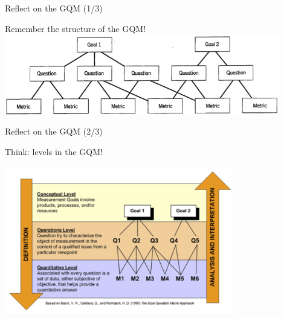\documentclass{beamer}
\begin{document}
\begin{frame}{\centerline{Reflect on the GQM (1/3)}}

\begin{center}
\Large Remember the structure of the GQM!\\
\vspace{0.5cm}
\includegraphics[width=120mm]{A2022.IDSEPC.SperimentazioneDeduzione/StructureGQM.png}
\end{center}

\end{frame}




\begin{frame}{\centerline{Reflect on the GQM (2/3)}}
\begin{center}
\Large Think: levels in the GQM!

\includegraphics[width=100mm]{A2022.IDSEPC.SperimentazioneDeduzione/LevelsGQM.png}
\end{center}

\end{frame}
\end{document}
